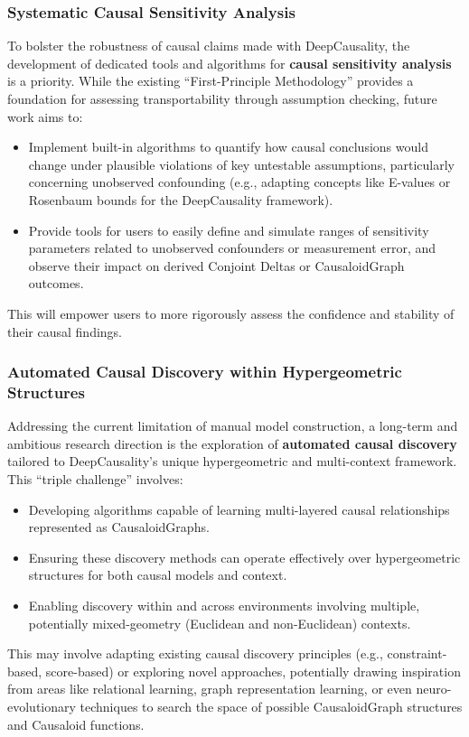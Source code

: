 \subsubsection{Systematic Causal Sensitivity Analysis}
To bolster the robustness of causal claims made with DeepCausality, the development of dedicated tools and algorithms for \textbf{causal sensitivity analysis} is a priority. While the existing ``First-Principle Methodology'' provides a foundation for assessing transportability through assumption checking, future work aims to:
\begin{itemize}
    \item Implement built-in algorithms to quantify how causal conclusions would change under plausible violations of key untestable assumptions, particularly concerning unobserved confounding (e.g., adapting concepts like E-values or Rosenbaum bounds for the DeepCausality framework).
    \item Provide tools for users to easily define and simulate ranges of sensitivity parameters related to unobserved confounders or measurement error, and observe their impact on derived Conjoint Deltas or CausaloidGraph outcomes.
\end{itemize}
This will empower users to more rigorously assess the confidence and stability of their causal findings.

\subsubsection{Automated Causal Discovery within Hypergeometric Structures}

Addressing the current limitation of manual model construction, a long-term and ambitious research direction is the exploration of \textbf{automated causal discovery} tailored to DeepCausality's unique hypergeometric and multi-context framework. This ``triple challenge'' involves:
\begin{itemize}
    \item Developing algorithms capable of learning multi-layered causal relationships represented as CausaloidGraphs.
    \item Ensuring these discovery methods can operate effectively over hypergeometric structures for both causal models and context.
    \item Enabling discovery within and across environments involving multiple, potentially mixed-geometry (Euclidean and non-Euclidean) contexts.
\end{itemize}
This may involve adapting existing causal discovery principles (e.g., constraint-based, score-based) or exploring novel approaches, potentially drawing inspiration from areas like relational learning, graph representation learning, or even neuro-evolutionary techniques to search the space of possible CausaloidGraph structures and Causaloid functions.

